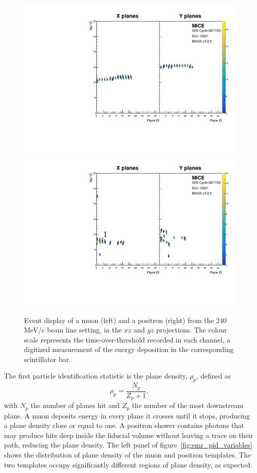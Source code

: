 \begin{figure}[htb!]
	\begin{center}
		\includegraphics[width=0.49\columnwidth]{single_muon.pdf}
		\hfill
		\includegraphics[width=0.49\columnwidth]{single_positron.pdf}
		\caption{Event display of a muon (left) and a positron (right) from the 240\,MeV/$c$ beam line setting, in the $xz$ and $yz$ projections. The colour scale represents the time-over-threshold recorded in each channel, a digitized measurement of the energy deposition in the corresponding scintillator bar.}
		\label{fig:emr_emu_events}
	\end{center}
\end{figure}

The first particle identification statistic is the plane density, $\rho_p$, defined as
\begin{equation}
\rho_p = \frac{N_p}{Z_p+1},
\end{equation}
with $N_p$ the number of planes hit and $Z_p$ the number of the most downstream plane. A muon deposits energy in every plane it crosses until it stops, producing a plane density close or equal to one. A positron shower contains photons that may produce hits deep inside the fiducial volume without leaving a trace on their path, reducing the plane density. The left panel of figure~\ref{fig:emr_pid_variables} shows the distribution of plane density of the muon and positron templates. The two templates occupy significantly different regions of plane density, as expected.

